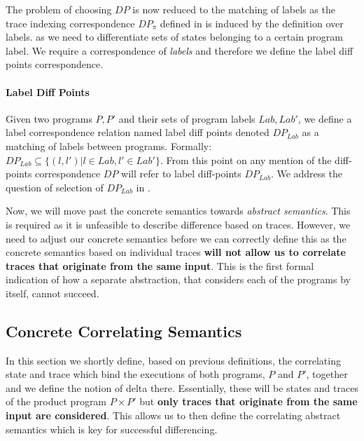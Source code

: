 The problem of choosing $DP$ is now reduced to the matching of labels as the trace indexing correspondence $DP_{\pi}$ defined in  is induced by the definition over labels. as we need to differentiate sets of states belonging to a certain program label. We require a correspondence of \emph{labels} and therefore we define the label diff points correspondence.

\paragraph{Label Diff Points} 
Given two programs $P,P'$ and their sets of program labels $Lab,Lab'$, we define a label correspondence relation named label diff points denoted $DP_{Lab}$ as a matching of labels between programs. Formally: $DP_{Lab} \subseteq \{(l,l')|l \in Lab, l' \in Lab'\}$. From this point on any mention of the diff-points correspondence $DP$ will refer to label diff-points $DP_{Lab}$. We address the question of selection of $DP_{Lab}$ in . %

Now, we will move past the concrete semantics towards \emph{abstract semantics}. This is required as it is unfeasible to describe difference based on traces. However, we need to adjust our concrete semantics before we can correctly define this as the concrete semantics based on individual traces \textbf{will not allow us to correlate traces that originate from the same input}. This is the first formal indication of how a separate abstraction, that considers each of the programs by itself, cannot succeed.

\subsection{Concrete Correlating Semantics} 

In this section we shortly define, based on previous definitions, the correlating state and trace which bind the executions of both programs, $P$ and $P'$, together and we define the notion of delta there. Essentially, these will be states and traces of the product program $P \times P'$ but \textbf{only traces that originate from the same input are considered}. This allows us to then define the correlating abstract semantics which is key for successful differencing.

